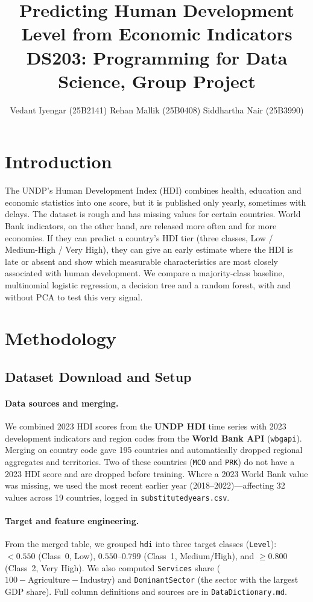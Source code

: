 \documentclass[10pt,a4paper]{article}
\title{\vspace{-1.5cm}\textbf{Predicting Human Development Level from Economic Indicators}\\
\large DS203: Programming for Data Science, Group Project}
\author{\normalsize Vedant Iyengar (25B2141) \quad Rehan Mallik (25B0408)
  \quad Siddhartha Nair (25B3990)}
\date{\vspace{-0.6cm}}
\renewcommand{\_}{\oldus\allowbreak}
\begin{document}
\maketitle

\section{Introduction}


The UNDP's Human Development Index (HDI) combines health, education
and economic statistics into one score, but it is published only yearly, sometimes with delays. The dataset is rough and has missing values for certain countries. World Bank indicators, on the other hand, are released more often and for more economies. If they can predict a country's HDI tier
(three classes, Low / Medium-High / Very High), they can give an early
estimate where the HDI is late or absent and show which measurable
characteristics are most closely associated with human development. We
compare a majority-class baseline, multinomial logistic regression, a
decision tree and a random forest, with and without PCA to test this very signal.


\section{Methodology}


\subsection{Dataset Download and Setup}

\paragraph{Data sources and merging.} We combined 2023 HDI scores from the \textbf{UNDP HDI} time series with 2023 development indicators and region codes from the \textbf{World Bank API} (\texttt{wbgapi}). Merging on country code gave 195 countries and automatically dropped regional aggregates and territories. Two of these countries (\texttt{MCO} and \texttt{PRK}) do not have a 2023 HDI score and are dropped before training. Where a 2023 World Bank value was missing, we used the most recent earlier year (2018--2022)---affecting 32 values across 19 countries, logged in \texttt{substituted\_years.csv}.

\paragraph{Target and feature engineering.} From the merged table, we grouped \texttt{hdi\_2023} into three target classes (\texttt{Level}): $< 0.550$ (Class~0, Low), $0.550\text{--}0.799$ (Class~1, Medium/High), and $\ge 0.800$ (Class~2, Very High). We also computed \texttt{Services} share ($100 - \text{Agriculture} - \text{Industry}$) and \texttt{Dominant\_Sector} (the sector with the largest GDP share). Full column definitions and sources are in \texttt{Data\_Dictionary.md}.
\end{document}
